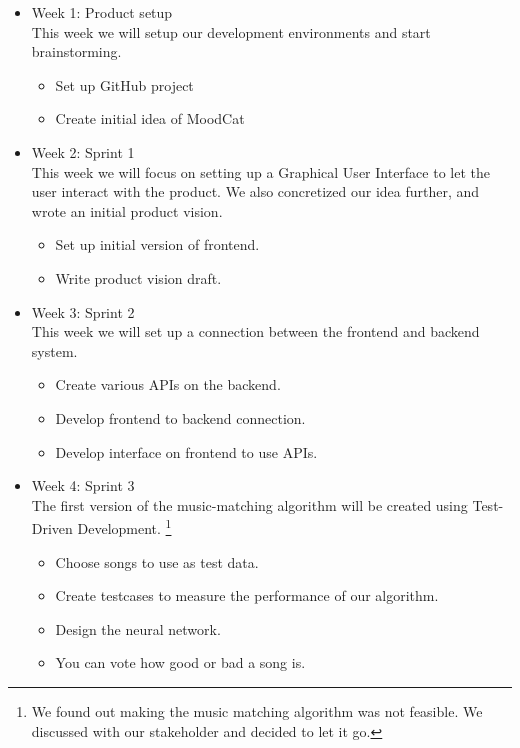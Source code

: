 \begin{itemize}
\item Week 1: Product setup\\
This week we will setup our development environments and start brainstorming.

\begin{itemize}
\item Set up GitHub project \cite{githubRepo}
\item Create initial idea of MoodCat
\end{itemize}

\item Week 2: Sprint 1\\
This week we will focus on setting up a Graphical User Interface to let the user interact with the product.
We also concretized our idea further, and wrote an initial product vision.

\begin{itemize}
\item Set up initial version of frontend.
\item Write product vision draft.
\end{itemize}

\item Week 3: Sprint 2\\
This week we will set up a connection between the frontend and backend system.

\begin{itemize}
\item Create various APIs on the backend.
\item Develop frontend to backend connection.
\item Develop interface on frontend to use \gls{APIs}.
\end{itemize}

\item Week 4: Sprint 3\\
The first version of the music-matching algorithm will be created using Test-Driven Development. \footnote{We found out making the music matching algorithm was not feasible. We discussed with our stakeholder and decided to let it go.}

\begin{itemize}
\item Choose songs to use as test data.
\item Create testcases to measure the performance of our algorithm.
\item Design the neural network. 
\item You can vote how good or bad a song is.
\end{itemize}


\end{itemize}
